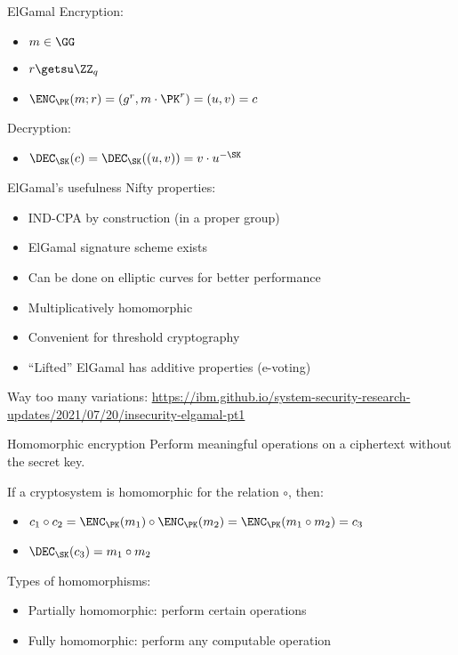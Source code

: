 \begin{frame}{ElGamal}
  Encryption:
  \begin{itemize}[<+(1)->]
    \item $m\in\GG$
    \item $r\getsu\ZZ_q$
    \item $\ENC_\PK(m; r) = (g^r, m\cdot \PK^r) = (u, v) = c$
  \end{itemize}

  \vspace*{2em}

  \pause
  Decryption:
  \begin{itemize}
    \item $\DEC_\SK(c) = \DEC_\SK((u, v)) = v \cdot u^{-\SK}$
  \end{itemize}
\end{frame}

\begin{frame}{ElGamal's usefulness}
  Nifty properties:
  \begin{itemize}[<+(1)->]
    \item IND-CPA by construction (in a proper group)
    \item ElGamal signature scheme exists
    \item Can be done on elliptic curves for better performance
    \item Multiplicatively homomorphic
    \item Convenient for threshold cryptography
    \item \enquote{Lifted} ElGamal has additive properties (e-voting)
  \end{itemize}

  \pause
  Way too many variations: {\scriptsize\url{https://ibm.github.io/system-security-research-updates/2021/07/20/insecurity-elgamal-pt1}}
\end{frame}

\begin{frame}{Homomorphic encryption}
  Perform meaningful operations on a ciphertext without the secret key.

  \vspace*{1em}

  \pause
  If a cryptosystem is homomorphic for the relation $\circ$, then:
  \begin{itemize}[<+(1)->]
    \item $c_1 \circ c_2 = \ENC_\PK(m_1) \circ \ENC_\PK(m_2) = \ENC_\PK(m_1 \circ m_2) = c_3$
    \item $\DEC_\SK(c_3) = m_1 \circ m_2$
  \end{itemize}

  \vspace*{1em}

  \pause
  Types of homomorphisms:
  \begin{itemize}[<+(1)->]
    \item Partially homomorphic: perform certain operations
    \item Fully homomorphic: perform any computable operation
  \end{itemize}
\end{frame}

